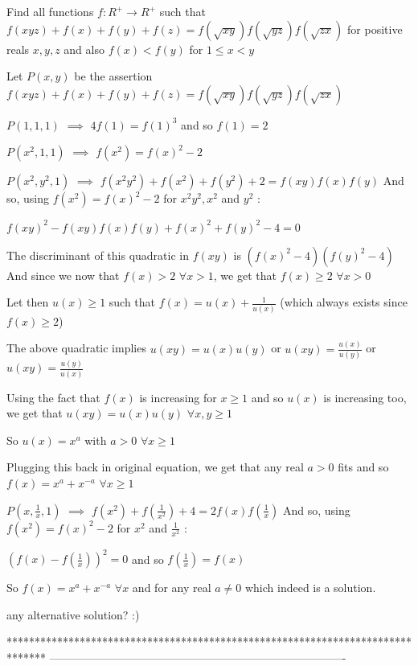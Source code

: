 \begin{solution}
	\begin{tcolorbox}Find all functions $f : R^{+}\rightarrow R^{+}$  such that $f(xyz)+f(x)+f(y)+f(z)=f(\sqrt{xy})f(\sqrt{yz})f(\sqrt{zx})$  for positive reals $x,y,z$ and also $f(x) < f(y)$ for
$1 \leq x <y$\end{tcolorbox}
Let $P(x,y)$ be the assertion $f(xyz)+f(x)+f(y)+f(z)=f(\sqrt{xy})f(\sqrt{yz})f(\sqrt{zx})$

$P(1,1,1)$ $\implies$ $4f(1)=f(1)^3$ and so $f(1)=2$

$P(x^2,1,1)$ $\implies$ $f(x^2)=f(x)^2-2$

$P(x^2,y^2,1)$ $\implies$ $f(x^2y^2)+f(x^2)+f(y^2)+2=f(xy)f(x)f(y)$
And so, using $f(x^2)=f(x)^2-2$ for $x^2y^2,x^2$ and $y^2$ :

$f(xy)^2-f(xy)f(x)f(y)+f(x)^2+f(y)^2-4=0$

The discriminant of this quadratic in $f(xy)$ is $(f(x)^2-4)(f(y)^2-4)$
And since we now that $f(x)>2$ $\forall x>1$, we get that $f(x)\ge 2$ $\forall x>0$

Let then $u(x)\ge 1$ such that $f(x)=u(x)+\frac 1{u(x)}$ (which always exists since $f(x)\ge 2$)

The above quadratic implies $u(xy)=u(x)u(y)$ or $u(xy)=\frac{u(x)}{u(y)}$ or $u(xy)=\frac{u(y)}{u(x)}$

Using the fact that $f(x)$ is increasing for $x\ge 1$ and so $u(x)$ is increasing too, we get that $u(xy)=u(x)u(y)$ $\forall x,y\ge 1$

So $u(x)=x^a$ with $a>0$ $\forall x\ge 1$

Plugging this back in original equation, we get that any real $a>0$ fits and so $f(x)=x^a+x^{-a}$ $\forall x\ge 1$

$P(x,\frac 1x,1)$ $\implies$ $f(x^2)+f(\frac 1{x^2})+4=2f(x)f(\frac 1x)$
And so, using $f(x^2)=f(x)^2-2$ for $x^2$ and $\frac 1{x^2}$ :

$(f(x)-f(\frac 1x))^2=0$ and so $f(\frac 1x)=f(x)$

So $\boxed{f(x)=x^a+x^{-a}}$ $\forall x$ and for any real $a\ne 0$ which indeed is a solution.
\end{solution}



\begin{solution}
	any alternative solution? :)
\end{solution}
*******************************************************************************
-------------------------------------------------------------------------------

